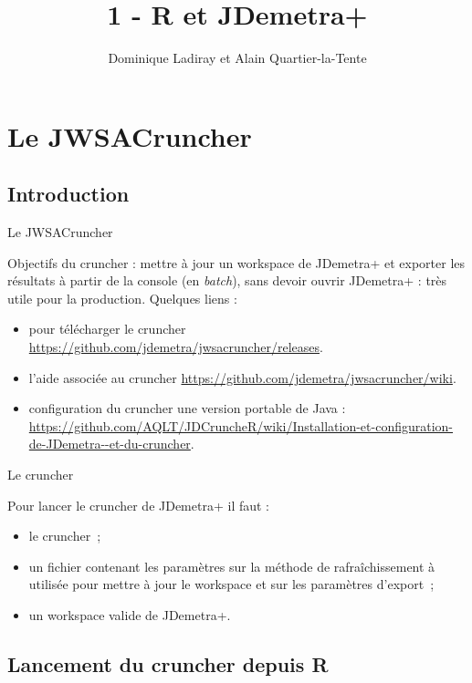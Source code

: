 \documentclass[10pt,xcolor=table,color={dvipsnames,usenames},ignorenonframetext,usepdftitle=false,french]{beamer}
\title{1 - R et JDemetra+}
\author{Dominique Ladiray et Alain Quartier-la-Tente}
\date{}
\begin{document}

\hypertarget{le-jwsacruncher}{%
\section{Le JWSACruncher}\label{le-jwsacruncher}}

\hypertarget{introduction}{%
\subsection{Introduction}\label{introduction}}

\begin{frame}{Le JWSACruncher}
\protect\hypertarget{le-jwsacruncher-1}{}

Objectifs du cruncher : mettre à jour un workspace de JDemetra+ et
exporter les résultats à partir de la console (en \emph{batch}), sans
devoir ouvrir JDemetra+ : très utile pour la production. Quelques liens
:

\begin{itemize}
\item
  pour télécharger le cruncher
  \url{https://github.com/jdemetra/jwsacruncher/releases}.
\item
  l'aide associée au cruncher
  \url{https://github.com/jdemetra/jwsacruncher/wiki}.
\item
  configuration du cruncher une version portable de Java :
  \url{https://github.com/AQLT/JDCruncheR/wiki/Installation-et-configuration-de-JDemetra--et-du-cruncher}.
\end{itemize}

\end{frame}

\begin{frame}{Le cruncher}
\protect\hypertarget{le-cruncher}{}

Pour lancer le cruncher de JDemetra+ il faut :

\begin{itemize}
\item
  le cruncher~;
\item
  un fichier contenant les paramètres sur la méthode de rafraîchissement
  à utilisée pour mettre à jour le workspace et sur les paramètres
  d'export~;
\item
  un workspace valide de JDemetra+.
\end{itemize}

\end{frame}

\hypertarget{lancement-du-cruncher-depuis-r}{%
\subsection{Lancement du cruncher depuis
R}\label{lancement-du-cruncher-depuis-r}}
\end{document}
